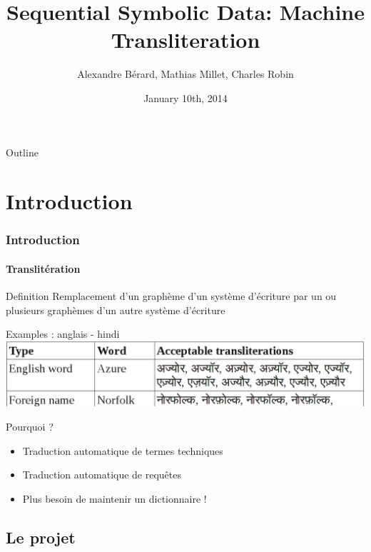 \documentclass{beamer}
\title[Machine Transliteration]{Sequential Symbolic Data: Machine Transliteration}
\author[A.~Bérard, M.~Millet, C.~Robin]{Alexandre Bérard, Mathias Millet, Charles Robin}
\date{January 10th, 2014}
\begin{document}
\begin{frame}
\titlepage
\end{frame}

\begin{frame}{Outline}
  \tableofcontents
\end{frame}

\section{Introduction}   
 
\begin{frame}
    \frametitle{Introduction}
	\framesubtitle{Translitération}
	\begin{block}{Definition}
	    Remplacement d'un graphème d'un système d'écriture par un ou plusieurs graphèmes d'un autre système d'écriture
    \end{block}	    
    
	\begin{exampleblock}{Examples : anglais - hindi}
	\includegraphics[scale=0.2]{en-in-example}
    \end{exampleblock}
    
	\begin{block}{Pourquoi ?}
	\begin{itemize}
		\item Traduction automatique de termes techniques
		\item Traduction automatique de requ\^etes
		\item Plus besoin de maintenir un dictionnaire !
	\end{itemize}
	\end{block}	    
    
    
\end{frame}

\subsection{Le projet}
\end{document}
